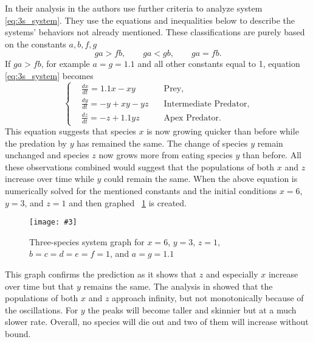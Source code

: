 \documentclass[12pt,a4paper,reqno]{amsart}
\newcommand{\figref}[1]{\textsc{\figurename}~\ref{#1}}
\newcommand{\makefig}[4]{
\begin{figure}[#1]
    \captionsetup{justification=centering}
    \texttt{[image: \#3]}
    \caption{#4}
    \label{fig:#3}
\end{figure}
}
\begin{document}
In their analysis in \cite{chauvet} the authors use further criteria to
analyze system \eqref{eq:3s_system}. They use the equations and inequalities
below to describe the systems' behaviors not already mentioned. These
classifications are purely based on the constants $a,b,f,g$ \cite{chauvet}
\begin{equation}\nonumber
    ga > fb, \qquad ga < gb, \qquad  ga = fb.
\end{equation}
If $ga > fb$, for example $a=g=1.1$ and all other constants equal to 1, 
equation \eqref{eq:3s_system} becomes
\begin{equation}\nonumber
    \left\{\begin{aligned}
        &\frac{dx}{dt} = 1.1x - xy              &\text{Prey,}\\
        &\frac{dy}{dt} = -y + xy - yz \quad &\text{Intermediate Predator,}\\
        &\frac{dz}{dt} = -z + 1.1yz             &\text{Apex Predator.}
    \end{aligned}\right.
\end{equation}
This equation suggests that species $x$ is now growing quicker than before
while the predation by $y$ has remained the same. The change of species $y$
remain unchanged and species $z$ now grows more from eating species $y$ than
before. All these observations combined would suggest that the populations of
both $x$ and $z$ increase over time while $y$ could remain the same. When the
above equation is numerically solved for the mentioned constants and the
initial conditions $x=6$, $y=3$, and $z=1$ and then graphed
\figref{fig:3s_ga_g_fb_graph} is created.
\makefig{h}{\textwidth}{3s_ga_g_fb_graph}{Three-species system graph for
$x=6$, $y=3$, $z=1$, $b=c=d=e=f=1$, and $a=g=1.1$}

This graph confirms the prediction as it shows that $z$ and especially $x$
increase over time but that $y$ remains the same. The analysis in
\cite{chauvet} showed that the populations of both $x$ and $z$ approach
infinity, but not monotonically because of the oscillations. For $y$ the peaks
will become taller and skinnier but at a much slower rate. Overall, no species
will die out and two of them will increase without bound.
\end{document}
